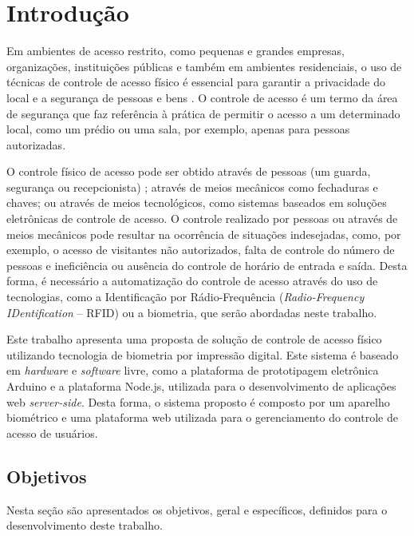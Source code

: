 \chapter{Introdução \label{cap:intro}}

Em ambientes de acesso restrito, como pequenas e grandes empresas, organizações, ins\-ti\-tui\-ções públicas e também em ambientes residenciais, o uso de técnicas de controle de acesso físico é essencial para garantir a privacidade do local e a segurança de pessoas e bens \cite{fennelly2012effective}. O controle de acesso  é um termo da área de segurança que faz referência à prática de permitir o acesso a um determinado local, como um prédio ou uma sala, por exemplo, apenas para pessoas autorizadas. 

O controle físico de acesso pode ser obtido através de pessoas (um guarda, segurança ou recepcionista) \cite{hess2008introduction, tyska2000physical}; através de meios mecânicos como fechaduras e chaves; ou através de meios tecnológicos, como sistemas baseados em soluções eletrônicas de controle de acesso. O controle realizado por pessoas ou através de meios mecânicos pode resultar na ocorrência de situações indesejadas, como, por exemplo, o acesso de visitantes não autorizados, falta de controle do número de pessoas e ineficiência ou ausência do controle de horário de entrada e saída. Desta forma, é necessário a automatização do controle de acesso através do uso de tecnologias, como a Identificação por Rádio-Frequência (\textit{Radio-Frequency IDentification} -- RFID) ou a biometria, que serão abordadas neste trabalho. 



Este trabalho apresenta uma proposta de solução de controle de acesso físico utilizando tecnologia de biometria por impressão digital. Este sistema é baseado em \textit{hardware} e \textit{software} livre, como a plataforma de prototipagem eletrônica Arduino e a plataforma Node.js, utilizada para o desenvolvimento de aplicações web \textit{server-side}. Desta forma, o sistema proposto é composto por um aparelho biométrico e uma plataforma web utilizada para o gerenciamento do controle de acesso de usuários.



\section{Objetivos}
Nesta seção são apresentados os objetivos, geral e específicos, definidos para o desenvolvimento deste trabalho.

